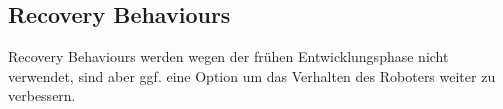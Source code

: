 \documentclass[oribibl]{llncs}
\begin{document}
\subsection{Recovery Behaviours}
Recovery Behaviours werden wegen der frühen Entwicklungsphase nicht verwendet, sind aber ggf. eine Option um das Verhalten des Roboters weiter zu verbessern.




\begin{figure}
\end{figure}
\end{document}

